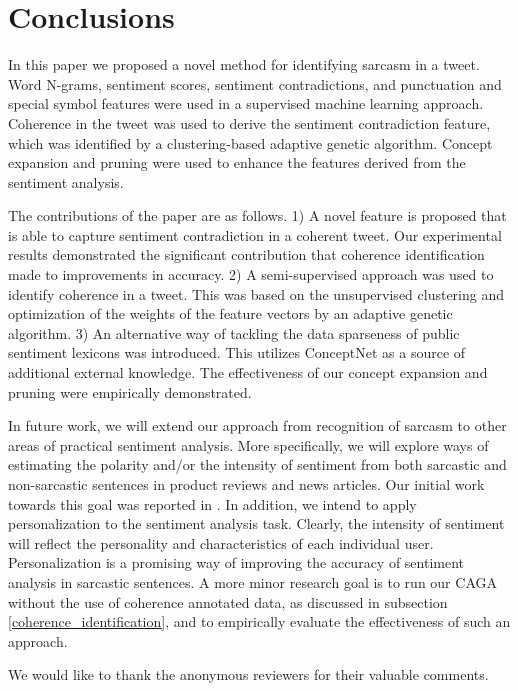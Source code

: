 \documentclass[english]{jnlp_1.4}
\begin{document}
\section{Conclusions}
\label{sec:conclusion}

In this paper we proposed a novel method for identifying sarcasm in a tweet.
Word N-grams, sentiment scores, sentiment contradictions, and punctuation and special symbol features were used in a supervised machine learning approach.
Coherence in the tweet was used to derive the sentiment contradiction feature, which was identified by a clustering-based adaptive genetic algorithm.
Concept expansion and pruning were used to enhance the features derived from the sentiment analysis.

The contributions of the paper are as follows.
1) A novel feature is proposed that is able to capture sentiment contradiction in a coherent tweet.
Our experimental results demonstrated the significant contribution that coherence identification made to improvements in accuracy.
2) A semi-supervised approach was used to identify coherence in a tweet.
This was based on the unsupervised clustering and optimization of the weights of the feature vectors by an adaptive genetic algorithm.
3) An alternative way of tackling the data sparseness of public sentiment lexicons was introduced.
This utilizes ConceptNet as a source of additional external knowledge.
The effectiveness of our concept expansion and pruning were empirically demonstrated.

In future work, we will extend our approach from recognition of sarcasm to other areas of practical sentiment analysis.
More specifically, we will explore ways of estimating the polarity and/or the intensity of sentiment from both sarcastic and non-sarcastic sentences in product reviews and news articles.
Our initial work towards this goal was reported in .
In addition, we intend to apply personalization to the sentiment analysis task.
Clearly, the intensity of sentiment will reflect the personality and characteristics of each individual user.
Personalization is a promising way of improving the accuracy of sentiment analysis in sarcastic sentences.
A more minor research goal is to run our CAGA without the use of coherence annotated data, as discussed in subsection \ref{coherence_identification}, and to empirically evaluate the effectiveness of such an approach.


\acknowledgment

We would like to thank the anonymous reviewers for their valuable comments.
\end{document}
